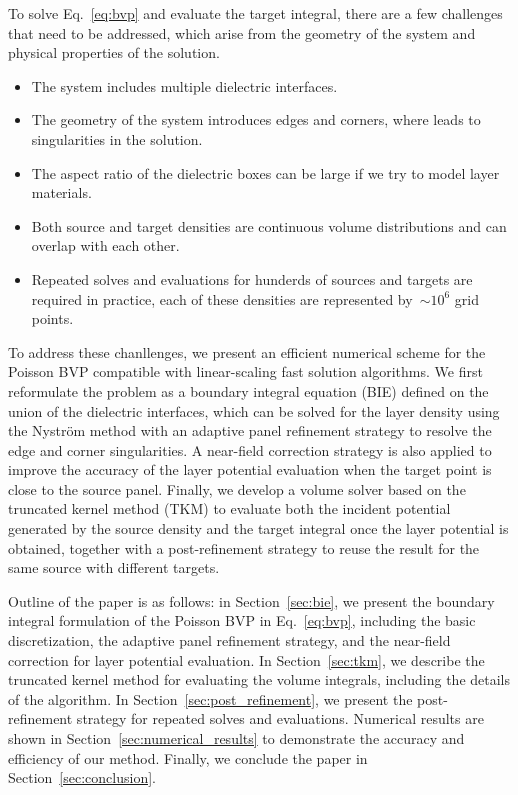 \documentclass[preprint,12pt]{elsarticle}
\begin{document}
To solve Eq.~\eqref{eq:bvp} and evaluate the target integral, there are a few challenges that need to be addressed, which arise from the geometry of the system and physical properties of the solution.
\begin{itemize}
    \item[1.] The system includes multiple dielectric interfaces.
    \item[2.] The geometry of the system introduces edges and corners, where leads to singularities in the solution.
    \item[3.] The aspect ratio of the dielectric boxes can be large if we try to model layer materials.
    \item[4.] Both source and target densities are continuous volume distributions and can overlap with each other.
    \item[5.] Repeated solves and evaluations for hunderds of sources and targets are required in practice, each of these densities are represented by~$\sim 10^6$ grid points.
\end{itemize}

To address these chanllenges, we present an eﬃcient numerical scheme for the Poisson BVP compatible with linear-scaling fast solution algorithms.
We first reformulate the problem as a boundary integral equation (BIE) defined on the union of the dielectric interfaces, which can be solved for the layer density using the Nystr\"om method with an adaptive panel refinement strategy to resolve the edge and corner singularities.
A near-field correction strategy is also applied to improve the accuracy of the layer potential evaluation when the target point is close to the source panel.
Finally, we develop a volume solver based on the truncated kernel method (TKM) to evaluate both the incident potential generated by the source density and the target integral once the layer potential is obtained, together with a post-refinement strategy to reuse the result for the same source with different targets.

Outline of the paper is as follows: in Section~\ref{sec:bie}, we present the boundary integral formulation of the Poisson BVP in Eq.~\eqref{eq:bvp}, including the basic discretization, the adaptive panel refinement strategy, and the near-field correction for layer potential evaluation. In Section~\ref{sec:tkm}, we describe the truncated kernel method for evaluating the volume integrals, including the details of the algorithm. In Section~\ref{sec:post_refinement}, we present the post-refinement strategy for repeated solves and evaluations.
Numerical results are shown in Section~\ref{sec:numerical_results} to demonstrate the accuracy and efficiency of our method.
Finally, we conclude the paper in Section~\ref{sec:conclusion}.
\end{document}

